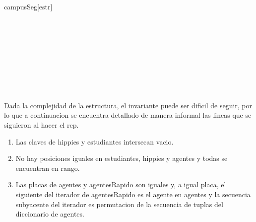 \begin{Representacion}
  

  \begin{Estructura}{campusSeg}[estr]
    \begin{Tupla}[estr]
		\\
		\\
		\\		
		\\
		\\
    \end{Tupla}
    
    \begin{Tupla}[sanciones]
	\end{Tupla}
		
	\begin{Tupla}[posiciones]
		\\
		\\
	\end{Tupla}
	
    \begin{Tupla}[datosAg]
    \end{Tupla}
  \end{Estructura}

	Dada la complejidad de la estructura, el invariante puede ser dificil de seguir, por lo que a continuacion se encuentra detallado de manera informal las lineas que se siguieron al hacer el rep.
	
	\begin{enumerate}
		\item Las claves de hippies y estudiantes intersecan vacio.
		\item No hay posiciones iguales en estudiantes, hippies y agentes y todas se encuentran en rango.
		\item Las placas de agentes y agentesRapido son iguales y, a igual placa, el siguiente del iterador de agentesRapido es el agente en agentes y la secuencia subyacente del iterador es permutacion de la secuencia de tuplas del diccionario de agentes.
		

\end{enumerate}
\end{Representacion}
